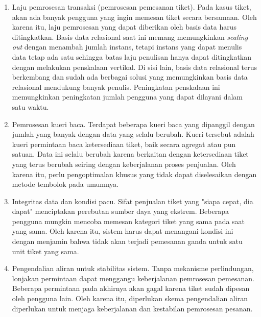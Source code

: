 \begin{enumerate}
    \item Laju pemrosesan transaksi (pemrosesan pemesanan tiket). Pada kasus tiket, akan ada banyak pengguna yang ingin memesan tiket secara bersamaan. Oleh karena itu, laju pemrosesan yang dapat diberikan oleh basis data harus ditingkatkan. Basis data relasional saat ini memang memungkinkan \textit{scaling out} dengan menambah jumlah instans, tetapi instans yang dapat menulis data tetap ada satu sehingga batas laju penulisan hanya dapat ditingkatkan dengan melakukan penskalaan vertikal. Di sisi lain, basis data relasional terus berkembang dan sudah ada berbagai solusi yang memungkinkan basis data relasional mendukung banyak penulis. Peningkatan penskalaan ini memungkinkan peningkatan jumlah pengguna yang dapat dilayani dalam satu waktu.
    \item Pemrosesan kueri baca. Terdapat beberapa kueri baca yang dipanggil dengan jumlah yang banyak dengan data yang selalu berubah. Kueri tersebut adalah kueri permintaan baca ketersediaan tiket, baik secara agregat atau pun satuan. Data ini selalu berubah karena berkaitan dengan ketersediaan tiket yang terus berubah seiring dengan keberjalanan proses penjualan. Oleh karena itu, perlu pengoptimalan khusus yang tidak dapat diselesaikan dengan metode tembolok pada umumnya.
    \item Integritas data dan kondisi pacu. Sifat penjualan tiket yang "siapa cepat, dia dapat" menciptakan perebutan sumber daya yang ekstrem. Beberapa pengguna mungkin mencoba memesan kategori tiket yang sama pada saat yang sama. Oleh karena itu, sistem harus dapat menangani kondisi ini dengan menjamin bahwa tidak akan terjadi pemesanan ganda untuk satu unit tiket yang sama.
    \item Pengendalian aliran untuk stabilitas sistem. Tanpa mekanisme perlindungan, lonjakan permintaan dapat menggangu keberjalanan pemrosesan pemesanan. Beberapa permintaan pada akhirnya akan gagal karena tiket sudah dipesan oleh pengguna lain. Oleh karena itu, diperlukan skema pengendalian aliran diperlukan untuk menjaga keberjalanan dan kestabilan pemrosesan pesanan.
\end{enumerate}
